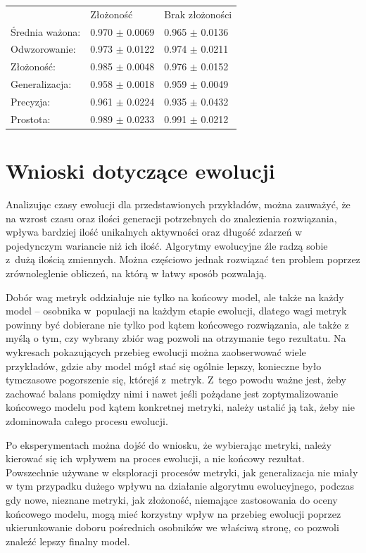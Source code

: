  \begin{center}
  \begin{tabular}{lll}
  					& Złożoność & Brak złożoności \\
	Średnia ważona: & 0.970 $\pm$ 0.0069 & 0.965 $\pm$ 0.0136 \\ 
	Odwzorowanie: & 0.973 $\pm$ 0.0122 & 0.974 $\pm$ 0.0211 \\
	Złożoność: & 0.985 $\pm$ 0.0048 & 0.976 $\pm$ 0.0152 \\
	Generalizacja: & 0.958 $\pm$ 0.0018 & 0.959 $\pm$ 0.0049 \\
	Precyzja: & 0.961 $\pm$ 0.0224 & 0.935 $\pm$ 0.0432 \\
	Prostota: & 0.989 $\pm$ 0.0233 & 0.991 $\pm$ 0.0212
  \end{tabular}
 \end{center}

\section{Wnioski dotyczące ewolucji}
Analizując czasy ewolucji dla przedstawionych przykładów, można zauważyć, że na wzrost czasu oraz ilości generacji potrzebnych do znalezienia rozwiązania, wpływa bardziej ilość unikalnych aktywności oraz długość zdarzeń w pojedynczym wariancie niż ich ilość. Algorytmy ewolucyjne źle radzą sobie z~dużą ilością zmiennych. Można częściowo jednak rozwiązać ten problem poprzez zrównoleglenie obliczeń, na którą w łatwy sposób pozwalają. 

Dobór wag metryk oddziałuje nie tylko na końcowy model, ale także na każdy model -- osobnika w~populacji na każdym etapie ewolucji, dlatego wagi metryk powinny być dobierane nie tylko pod kątem końcowego rozwiązania, ale także z myślą o tym, czy wybrany zbiór wag pozwoli na otrzymanie tego rezultatu. Na wykresach pokazujących przebieg ewolucji można zaobserwować wiele przykładów, gdzie aby model mógł stać się ogólnie lepszy, konieczne było tymczasowe pogorszenie się, którejś z~metryk. Z~tego powodu ważne jest, żeby zachować balans pomiędzy nimi i nawet jeśli pożądane jest zoptymalizowanie końcowego modelu pod kątem konkretnej metryki, należy ustalić ją tak, żeby nie zdominowała całego procesu ewolucji. 

Po eksperymentach można dojść do wniosku, że wybierając metryki, należy kierować się ich wpływem na proces ewolucji, a nie końcowy rezultat. Powszechnie używane w eksploracji procesów metryki, jak generalizacja nie miały w tym przypadku dużego wpływu na działanie algorytmu ewolucyjnego, podczas gdy nowe, nieznane metryki, jak złożoność, niemające zastosowania do oceny końcowego modelu, mogą mieć korzystny wpływ na przebieg ewolucji poprzez ukierunkowanie doboru pośrednich osobników we właściwą stronę, co pozwoli znaleźć lepszy finalny model.
